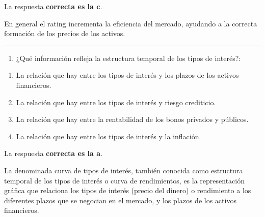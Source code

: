 \documentclass[
  letterpaper,
  DIV=11,
  numbers=noendperiod]{scrreprt}
\providecommand{\tightlist}{%
  \setlength{\itemsep}{0pt}\setlength{\parskip}{0pt}}\usepackage{longtable,booktabs,array}
\begin{document}
\begin{tcolorbox}[enhanced jigsaw, left=2mm, opacityback=0, colback=white, breakable, arc=.35mm, bottomrule=.15mm, rightrule=.15mm, toprule=.15mm, leftrule=.75mm, colframe=quarto-callout-tip-color-frame]
\begin{minipage}[t]{5.5mm}
\textcolor{quarto-callout-tip-color}{\faLightbulb}
\end{minipage}%
\begin{minipage}[t]{\textwidth - 5.5mm}

La respuesta \textbf{correcta es la c}.

En general el rating incrementa la eficiencia del mercado, ayudando a la
correcta formación de los precios de los activos.

\end{minipage}%
\end{tcolorbox}

\begin{center}\rule{0.5\linewidth}{0.5pt}\end{center}

\begin{enumerate}
\def\labelenumi{\arabic{enumi}.}
\setcounter{enumi}{26}
\tightlist
\item
  ¿Qué información refleja la estructura temporal de los tipos de
  interés?:
\end{enumerate}

\begin{enumerate}
\def\labelenumi{\alph{enumi}.}
\item
  La relación que hay entre los tipos de interés y los plazos de los
  activos financieros.
\item
  La relación que hay entre los tipos de interés y riesgo crediticio.
\item
  La relación que hay entre la rentabilidad de los bonos privados y
  públicos.
\item
  La relación que hay entre los tipos de interés y la inflación.
\end{enumerate}

\begin{tcolorbox}[enhanced jigsaw, left=2mm, opacityback=0, colback=white, breakable, arc=.35mm, bottomrule=.15mm, rightrule=.15mm, toprule=.15mm, leftrule=.75mm, colframe=quarto-callout-tip-color-frame]
\begin{minipage}[t]{5.5mm}
\textcolor{quarto-callout-tip-color}{\faLightbulb}
\end{minipage}%
\begin{minipage}[t]{\textwidth - 5.5mm}

La respuesta \textbf{correcta es la a}.

La denominada curva de tipos de interés, también conocida como
estructura temporal de los tipos de interés o curva de rendimientos, es
la representación gráfica que relaciona los tipos de interés (precio del
dinero) o rendimiento a los diferentes plazos que se negocian en el
mercado, y los plazos de los activos financieros.

\end{minipage}%
\end{tcolorbox}
\end{document}
